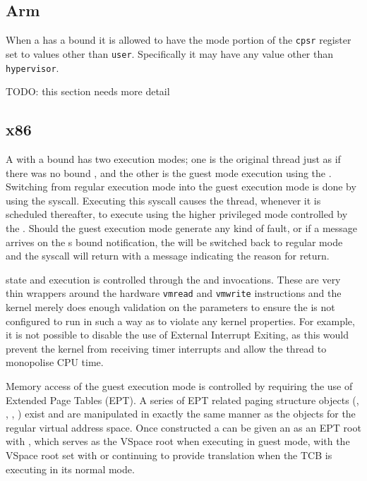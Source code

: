 \subsection{Arm}

When a  has a bound  it is allowed to have the mode portion of the
\texttt{cpsr} register set to values other than \texttt{user}. Specifically it may have any value other than
\texttt{hypervisor}.

TODO: this section needs more detail

\subsection{x86}

A  with a bound  has two execution modes; one is the original thread just as
if there was no bound , and the other is the guest mode execution using the
. Switching from regular execution mode into the guest execution mode is
done by using the  syscall. Executing this syscall causes the thread, whenever
it is scheduled thereafter, to execute using the higher privileged mode controlled by the .
Should the guest execution mode generate any kind of fault, or if a message arrives
on the s bound notification, the  will be switched back to regular mode
and the  syscall will return with a message indicating the reason for return.

 state and execution is controlled through the 
and  invocations.
These are very thin wrappers around the hardware \texttt{vmread} and \texttt{vmwrite} instructions and the kernel
merely does enough validation on the parameters to ensure the  is not configured
to run in such a way as to violate any kernel properties. For example, it is not possible to
disable the use of External Interrupt Exiting, as this would prevent the kernel from receiving
timer interrupts and allow the thread to monopolise CPU time.

Memory access of the guest execution mode is controlled by requiring the use of Extended
Page Tables (EPT). A series of EPT related paging structure objects (, , , )
exist and are manipulated in exactly the same manner as the objects for the regular virtual
address space. Once constructed a  can be given an  as an EPT root with ,
which serves as the VSpace root when executing in guest mode, with the VSpace root set
with  or 
continuing to provide translation when the TCB is executing in its normal mode.

